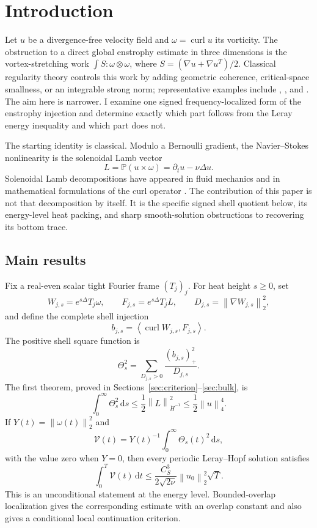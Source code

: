 \documentclass[11pt]{article}
\theoremstyle{definition}
\newcommand{\Pp}{\mathbb P}
\newcommand{\curl}{\operatorname{curl}}
\newcommand{\ip}[2]{\left\langle #1,#2\right\rangle}
\newcommand{\norm}[1]{\left\lVert #1\right\rVert}
\newcommand{\pos}[1]{\left(#1\right)_{+}}
\newcommand{\dd}{\,\mathrm d}
\begin{document}
\section{Introduction}

Let \(u\) be a divergence-free velocity field and
\(\omega=\curl u\) its vorticity.  The obstruction to a direct global
enstrophy estimate in three dimensions is the vortex-stretching work
\(\int S:\omega\otimes\omega\), where
\(S=(\nabla u+\nabla u^{T})/2\).  Classical regularity theory controls this
work by adding geometric coherence, critical-space smallness, or an
integrable strong norm; representative examples include
\citet{Serrin1962}, \citet{ConstantinFefferman1993}, and
\citet{KochTataru2001}.  The aim here is narrower.  I examine one signed
frequency-localized form of the enstrophy injection and determine exactly
which part follows from the Leray energy inequality and which part does not.

The starting identity is classical.  Modulo a Bernoulli gradient, the
Navier--Stokes nonlinearity is the solenoidal Lamb vector
\[
  L=\Pp(u\times\omega)=\partial_tu-\nu\Delta u.
\]
Solenoidal Lamb decompositions have appeared in fluid mechanics and in
mathematical formulations of the curl operator
\cite{Shtilman1992,IyerSreenivasanYeung2022,LernerVigneron2022}.  The
contribution of this paper is not that decomposition by itself.  It is the
specific signed shell quotient below, its energy-level heat packing, and
sharp smooth-solution obstructions to recovering its bottom trace.

\subsection{Main results}

Fix a real-even scalar tight Fourier frame \((T_j)_j\).  For heat height
\(s\ge0\), set
\[
 W_{j,s}=e^{s\Delta}T_j\omega,
 \qquad F_{j,s}=e^{s\Delta}T_jL,
 \qquad D_{j,s}=\norm{\nabla W_{j,s}}_2^2,
\]
and define the complete shell injection
\[
 b_{j,s}=\ip{\curl W_{j,s}}{F_{j,s}}.
\]
The positive shell square function is
\[
 \Theta_s^2
 =\sum_{D_{j,s}>0}\frac{\pos{b_{j,s}}^2}{D_{j,s}}.
\]
The first theorem, proved in Sections~\ref{sec:criterion}--\ref{sec:bulk},
is
\begin{equation}\label{eq:intro-bulk}
 \int_0^\infty\Theta_s^2\dd s
 \le \frac12\norm{L}_{\dot H^{-1}}^2
 \le \frac12\norm{u}_4^4.
\end{equation}
If \(Y(t)=\norm{\omega(t)}_2^2\) and
\[
 \mathcal V(t)=Y(t)^{-1}\int_0^\infty\Theta_s(t)^2\dd s,
\]
with the value zero when \(Y=0\), then every periodic Leray--Hopf solution
satisfies
\begin{equation}\label{eq:intro-time}
 \int_0^T\mathcal V(t)\dd t
 \le \frac{C_S^3}{2\sqrt{2\nu}}\norm{u_0}_2^2\sqrt T.
\end{equation}
This is an unconditional statement at the energy level.  Bounded-overlap
localization gives the corresponding estimate with an overlap constant and
also gives a conditional local continuation criterion.
\end{document}
